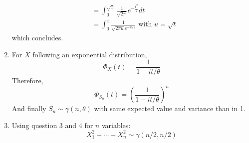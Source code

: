 \begin{solution}
\begin{enumerate}
\begin{align*}
                               & = \int_0^{\sqrt{x}} \frac{1}{\sqrt{2\pi}} e^{-\frac{t^2}{2}} dt           \\
                               & = \int_0^{x} \frac{1}{\sqrt{2 \pi u} e^{-u/2}} \text{ with } u = \sqrt{t}
          \end{align*}
          which concludes.
    \item For $X$ following an exponential distribution,
          \[
            \Phi_X(t) = \frac{1}{1 - it/\theta}
          \]
          Therefore,
          \[
            \Phi_{S_n}(t) = {\left( \frac{1}{1 - it/\theta} \right)}^n
          \]
          And finally $S_n \sim \gamma(n, \theta)$ with same expected value and variance
          than in 1.
    \item Using question 3 and 4 for $n$ variables:
          \[
            X_1^2 + \cdots + X_n^2 \sim \gamma(n/2, n/2)
          \]

  \end{enumerate}
\end{solution}